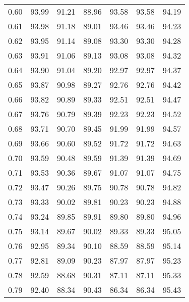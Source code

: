 \begin{tabular}{|c|c|c|c|c|c|c|}
      0.60 &     93.99 &     91.21 &      88.96 &   93.58 &      93.58 &         94.19 \\
      0.61 &     93.98 &     91.18 &      89.01 &   93.46 &      93.46 &         94.23 \\
      0.62 &     93.95 &     91.14 &      89.08 &   93.30 &      93.30 &         94.28 \\
      0.63 &     93.91 &     91.06 &      89.13 &   93.08 &      93.08 &         94.32 \\
      0.64 &     93.90 &     91.04 &      89.20 &   92.97 &      92.97 &         94.37 \\
      0.65 &     93.87 &     90.98 &      89.27 &   92.76 &      92.76 &         94.42 \\
      0.66 &     93.82 &     90.89 &      89.33 &   92.51 &      92.51 &         94.47 \\
      0.67 &     93.76 &     90.79 &      89.39 &   92.23 &      92.23 &         94.52 \\
      0.68 &     93.71 &     90.70 &      89.45 &   91.99 &      91.99 &         94.57 \\
      0.69 &     93.66 &     90.60 &      89.52 &   91.72 &      91.72 &         94.63 \\
      0.70 &     93.59 &     90.48 &      89.59 &   91.39 &      91.39 &         94.69 \\
      0.71 &     93.53 &     90.36 &      89.67 &   91.07 &      91.07 &         94.75 \\
      0.72 &     93.47 &     90.26 &      89.75 &   90.78 &      90.78 &         94.82 \\
      0.73 &     93.33 &     90.02 &      89.81 &   90.23 &      90.23 &         94.88 \\
      0.74 &     93.24 &     89.85 &      89.91 &   89.80 &      89.80 &         94.96 \\
      0.75 &     93.14 &     89.67 &      90.02 &   89.33 &      89.33 &         95.05 \\
      0.76 &     92.95 &     89.34 &      90.10 &   88.59 &      88.59 &         95.14 \\
      0.77 &     92.81 &     89.09 &      90.23 &   87.97 &      87.97 &         95.23 \\
      0.78 &     92.59 &     88.68 &      90.31 &   87.11 &      87.11 &         95.33 \\
      0.79 &     92.40 &     88.34 &      90.43 &   86.34 &      86.34 &         95.43 \\

\end{tabular}
